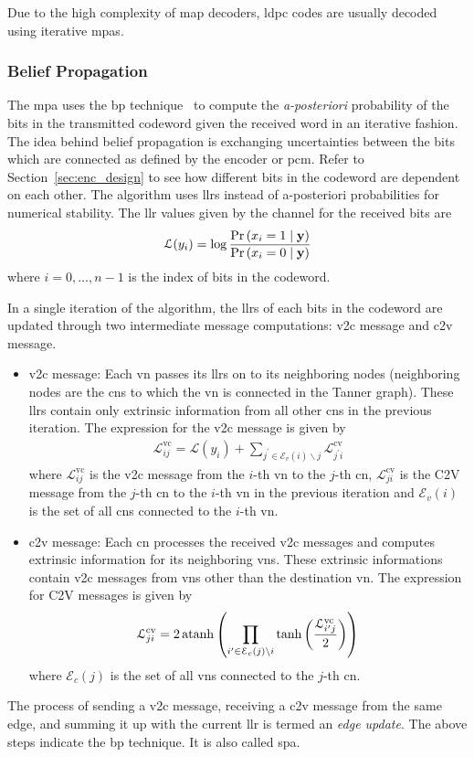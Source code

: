 Due to the high complexity of \ac{map} decoders, \ac{ldpc} codes are usually decoded using iterative \acfp{mpa}.
\subsubsection{Belief Propagation}
The \ac{mpa} uses the \ac{bp} technique~\cite{Hagenauer1996} to compute the \emph{a-posteriori} probability of the bits in the transmitted codeword given the received word in an iterative fashion. The idea behind belief propagation is exchanging uncertainties between the bits which are connected as defined by the encoder or \ac{pcm}. Refer to Section~\ref{sec:enc_design} to see how different bits in the codeword are dependent on each other. The algorithm uses \acp{llr} instead of a-posteriori probabilities for numerical stability. The \ac{llr} values given by the channel for the received bits are
$$\mathcal{L}(y_i)=\log\frac{\text{Pr}\left(x_i=1\mid\mathbf{y}\right)}{\text{Pr}\left(x_i=0\mid\mathbf{y}\right)}$$
where $i=0,\dots,n-1$ is the index of bits in the codeword.

In a single iteration of the algorithm, the \acp{llr} of each bits in the codeword are updated through two intermediate message computations: \ac{v2c} message and \ac{c2v} message.
\begin{itemize}
  \item \ac{v2c} message: Each \ac{vn} passes its \acp{llr} on to its neighboring nodes (neighboring nodes are the \acp{cn} to which the \ac{vn} is connected in the Tanner graph). These \acp{llr} contain only extrinsic information from all other \acp{cn} in the previous iteration. The expression for the \ac{v2c} message is given by~\cite{Hagenauer1996}
  \begin{align}
    \mathcal{L}^{\mathrm{vc}}_{ij}=\mathcal{L}(y_i)+\sum_{j^\prime\in\mathcal{E}_v(i)\backslash j} \mathcal{L}^{\mathrm{cv}}_{j^\prime i}
  \end{align}
  where $\mathcal{L}^{\mathrm{vc}}_{ij}$ is the \ac{v2c} message from the $i$-th \ac{vn} to the $j$-th \ac{cn}, $\mathcal{L}^{\mathrm{cv}}_{ji}$ is the C2V message from the $j$-th \ac{cn} to the $i$-th \ac{vn} in the previous iteration and $\mathcal{E}_v(i)$ is the set of all \acp{cn} connected to the $i$-th \ac{vn}.
  \item \ac{c2v} message: Each \ac{cn} processes the received \ac{v2c} messages and computes extrinsic information for its neighboring \acp{vn}. These extrinsic informations contain \ac{v2c} messages from \acp{vn} other than the destination \ac{vn}. The expression for C2V messages is given by~\cite{Hagenauer1996}
  \begin{align}\label{eq:c2v}
  \mathcal{L}^{\mathrm{cv}}_{ji}=2\operatorname{atanh}\left(\prod_{i^\prime\in\mathcal{E}_c(j)\backslash i}\tanh\left(\frac{\mathcal{L}^{\mathrm{vc}}_{i^\prime j}}{2}\right)\right)
  \end{align}
  where $\mathcal{E}_c(j)$ is the set of all \acp{vn} connected to the $j$-th \ac{cn}.
\end{itemize}
The process of sending a \ac{v2c} message, receiving a \ac{c2v} message from the same edge, and summing it up with the current \ac{llr} is termed an \emph{edge update}. The above steps indicate the \ac{bp} technique. It is also called \ac{spa}.

